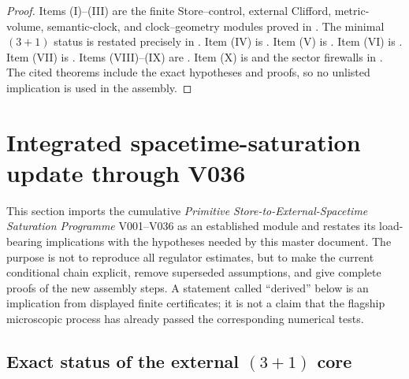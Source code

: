 \documentclass[11pt]{article}
\theoremstyle{definition}
\theoremstyle{remark}
\begin{document}
\begin{proof}
Items \textup{(I)--(III)} are the finite Store--control, external Clifford,
metric-volume, semantic-clock, and clock--geometry modules proved in
.
The minimal \((3+1)\) status is restated precisely in
.  Item \textup{(IV)} is
.  Item
\textup{(V)} is .  Item \textup{(VI)} is
.  Item \textup{(VII)} is
.  Items \textup{(VIII)--(IX)} are
.
Item \textup{(X)} is 
and the sector firewalls in .  The cited
theorems include the exact hypotheses and proofs, so no unlisted implication
is used in the assembly.
\end{proof}

\section{Integrated spacetime-saturation update through V036}
\label{sec:master-V036-update}

This section imports the cumulative
\emph{Primitive Store-to-External-Spacetime Saturation Programme} V001--V036
as an established module and restates its load-bearing implications with the
hypotheses needed by this master document.  The purpose is not to reproduce
all regulator estimates, but to make the current conditional chain explicit,
remove superseded assumptions, and give complete proofs of the new assembly
steps.  A statement called ``derived'' below is an implication from displayed
finite certificates; it is not a claim that the flagship microscopic process
has already passed the corresponding numerical tests.

\subsection{Exact status of the external \texorpdfstring{$(3+1)$}{(3+1)} core}
\end{document}
